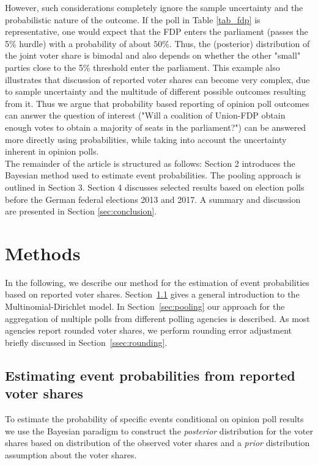 \documentclass[smallcondensed]{svjour3}     %
\begin{document}
However, such considerations completely ignore the sample uncertainty and the
probabilistic nature of the outcome. If the poll in Table \ref{tab_fdp} is representative,
one would expect that the FDP enters the parliament (passes the 5\% hurdle) with a
probability of about $50\%$. Thus, the (posterior) distribution of the joint voter
share is bimodal and also depends on whether the other "small" parties close to
the 5\% threshold enter the parliament. This example also illustrates that discussion
of reported voter shares can become very complex, due to sample uncertainty
and the multitude of different possible outcomes resulting from it.
Thus we argue that probability based reporting of opinion poll outcomes can answer
the question of interest ("Will a coalition of Union-FDP obtain enough votes to
obtain a majority of seats in the parliament?") can be answered more directly
using probabilities, while taking into account the uncertainty inherent in
opinion polls.\\

The remainder of the article is structured as follows: Section 2 introduces the
Bayesian method used to estimate event probabilities. The pooling approach is
outlined in Section 3. Section 4 discusses selected results based on election
polls before the German federal elections 2013 and 2017. A summary and
discussion are presented in Section \ref{sec:conclusion}.\\

\section{Methods}
In the following, we describe our method for the estimation of event probabilities
based on reported voter shares. Section~\ref{sec:method} gives a general
introduction to the Multinomial-Dirichlet model. In Section~\ref{sec:pooling} our
approach for the aggregation of multiple polls from different polling agencies
is described. As most agencies report rounded voter shares, we perform rounding
error adjustment briefly discussed in Section~\ref{ssec:rounding}.

\subsection{Estimating event probabilities from reported voter shares} \label{sec:method}
To estimate the probability of specific events conditional on opinion poll results
we use the Bayesian paradigm to construct the \emph{posterior} distribution for
the voter shares based on distribution of the observed voter shares and a
\emph{prior} distribution assumption about the voter shares.\\
\end{document}

